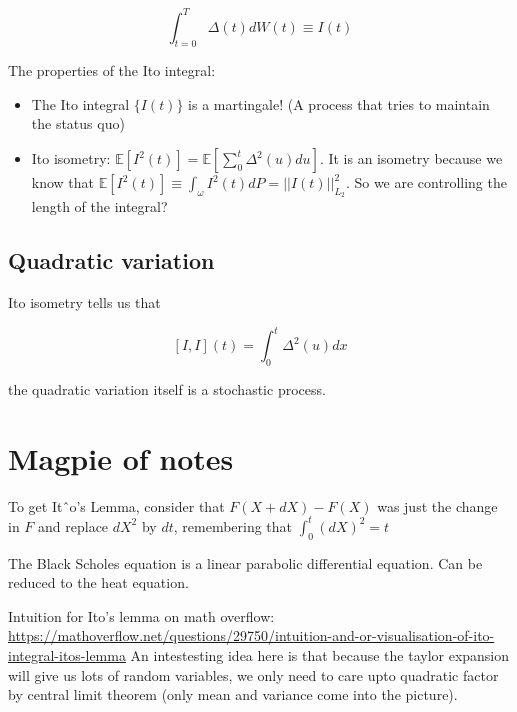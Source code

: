 \documentclass{book}
\newcommand{\E}{\ensuremath{\mathbb{E}}}
\theoremstyle{definition}
\begin{document}
$$
\int_{t=0}^T \Delta(t) dW(t) \equiv I(t)
$$

The properties of the Ito integral:

\begin{itemize}
\item The Ito integral $\{ I(t) \}$ is a martingale! (A process that tries to maintain the status quo)
\item Ito isometry: $\E[I^2(t)] = \E[\sum_0^t \Delta^2(u) du]$. It is an isometry because
  we know that $\E[I^2(t)] \equiv \int_{\omega} I^2(t) dP = ||I(t)||^2_{L_2}$. So we are 
  controlling the length of the integral?
\end{itemize}

\section{Quadratic variation}
Ito isometry tells us that 

$$
[I, I](t) = \int_0^t \Delta^2(u) dx
$$

the quadratic variation itself is a stochastic process.

\chapter{Magpie of notes}

To get Itˆo’s Lemma, consider that $F(X + dX) − F(X)$ was just the
change in $F$ and replace $dX^2$ by $dt$, remembering that $\int_0^t (dX)^2 = t$

The Black Scholes equation is a linear parabolic differential equation. Can be
reduced to the heat equation.

Intuition for Ito's lemma on math overflow: \url{https://mathoverflow.net/questions/29750/intuition-and-or-visualisation-of-ito-integral-itos-lemma}
An intestesting idea here is that because the taylor expansion will give us lots of random
variables, we only need to care upto quadratic factor by central limit theorem (only mean and variance come into the picture).
\end{document}

